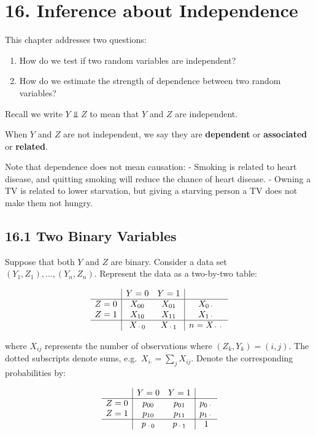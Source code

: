 \section{16. Inference about Independence}\label{inference-about-independence}

This chapter addresses two questions:

\begin{enumerate}[tightlist,label={\arabic*.}]
\item
  How do we test if two random variables are independent?
\item
  How do we estimate the strength of dependence between two random
  variables?
\end{enumerate}

Recall we write \(Y \text{ ⫫ } Z\) to mean that \(Y\) and \(Z\) are
independent.

When \(Y\) and \(Z\) are not independent, we say they are
\textbf{dependent} or \textbf{associated} or \textbf{related}.

Note that dependence does not mean causation: - Smoking is related to
heart disease, and quitting smoking will reduce the chance of heart
disease. - Owning a TV is related to lower starvation, but giving a
starving person a TV does not make them not hungry.

\subsection{16.1 Two Binary Variables}\label{two-binary-variables}

Suppose that both \(Y\) and \(Z\) are binary. Consider a data set
\((Y_1, Z_1), \dots, (Y_n, Z_n)\). Represent the data as a two-by-two
table:

\[
\begin{array}{c|cc|c} 
      & Y = 0  & Y = 1 & \\
\hline
Z = 0 & X_{00} & X_{01} & X_{0\text{·}}\\
Z = 1 & X_{10} & X_{11} & X_{1\text{·}}\\
 \hline
      & X_{\text{·}0} & X_{\text{·}1} & n = X_{\text{··}}
\end{array}
\]

where \(X_{ij}\) represents the number of observations where
\((Z_k, Y_k) = (i, j)\). The dotted subscripts denote sums,
e.g.~\(X_{i\text{·}} = \sum_j X_{ij}\). Denote the corresponding
probabilities by:

\[
\begin{array}{c|cc|c} 
      & Y = 0  & Y = 1 & \\
\hline
Z = 0 & p_{00} & p_{01} & p_{0\text{·}}\\
Z = 1 & p_{10} & p_{11} & p_{1\text{·}}\\
 \hline
      & p_{\text{·}0} & p_{\text{·}1} & 1
\end{array}
\]

